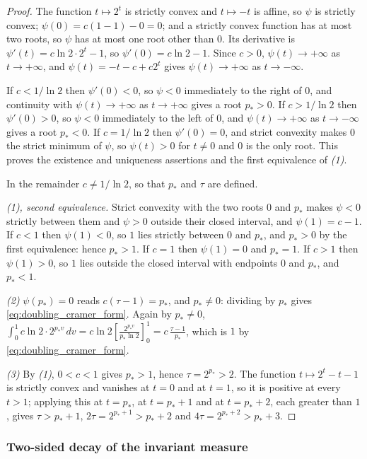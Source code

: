 \begin{proof}
The function $t\mapsto2^{t}$ is strictly convex and $t\mapsto-t$ is affine, so $\psi$ is
strictly convex; $\psi(0)=c(1-1)-0=0$; and a strictly convex function has at most two roots,
so $\psi$ has at most one root other than $0$. Its derivative is
$\psi'(t)=c\ln2\cdot2^{t}-1$, so $\psi'(0)=c\ln2-1$. Since $c>0$,
$\psi(t)\rightarrow+\infty$ as $t\rightarrow+\infty$, and $\psi(t)=-t-c+c2^{t}$ gives
$\psi(t)\rightarrow+\infty$ as $t\rightarrow-\infty$.

If $c<1/\ln2$ then $\psi'(0)<0$, so $\psi<0$ immediately to the right of $0$, and continuity
with $\psi(t)\rightarrow+\infty$ as $t\rightarrow+\infty$ gives a root $p_*>0$. If
$c>1/\ln2$ then $\psi'(0)>0$, so $\psi<0$ immediately to the left of $0$, and
$\psi(t)\rightarrow+\infty$ as $t\rightarrow-\infty$ gives a root $p_*<0$. If $c=1/\ln2$ then
$\psi'(0)=0$, and strict convexity makes $0$ the strict minimum of $\psi$, so $\psi(t)>0$ for
$t\neq0$ and $0$ is the only root. This proves the existence and uniqueness assertions and the
first equivalence of \emph{(1)}.

In the remainder $c\neq1/\ln2$, so that $p_*$ and $\tau$ are defined.

\emph{(1), second equivalence.} Strict convexity with the two roots $0$ and $p_*$ makes $\psi<0$ strictly
between them and $\psi>0$ outside their closed interval, and $\psi(1)=c-1$. If $c<1$ then
$\psi(1)<0$, so $1$ lies strictly between $0$ and $p_*$, and $p_*>0$ by the first
equivalence: hence $p_*>1$. If $c=1$ then $\psi(1)=0$ and $p_*=1$. If $c>1$ then
$\psi(1)>0$, so $1$ lies outside the closed interval with endpoints $0$ and $p_*$, and
$p_*<1$.

\emph{(2)} $\psi(p_*)=0$ reads $c(\tau-1)=p_*$, and $p_*\neq0$: dividing by $p_*$ gives
\eqref{eq:doubling_cramer_form}. Again by $p_*\neq0$,
$\int_0^1c\ln2\cdot2^{p_*v}\,dv=c\ln2\left[\frac{2^{p_*v}}{p_*\ln2}\right]_0^1=c\,\frac{\tau-1}{p_*}$,
which is $1$ by \eqref{eq:doubling_cramer_form}.

\emph{(3)} By \emph{(1)}, $0<c<1$ gives $p_*>1$, hence $\tau=2^{p_*}>2$. The function
$t\mapsto2^{t}-t-1$ is strictly convex and vanishes at $t=0$ and at $t=1$, so it is positive
at every $t>1$; applying this at $t=p_*$, at $t=p_*+1$ and at $t=p_*+2$, each greater than
$1$, gives $\tau>p_*+1$, $2\tau=2^{p_*+1}>p_*+2$ and $4\tau=2^{p_*+2}>p_*+3$.
\end{proof}

\subsubsection{Two-sided decay of the invariant measure}

